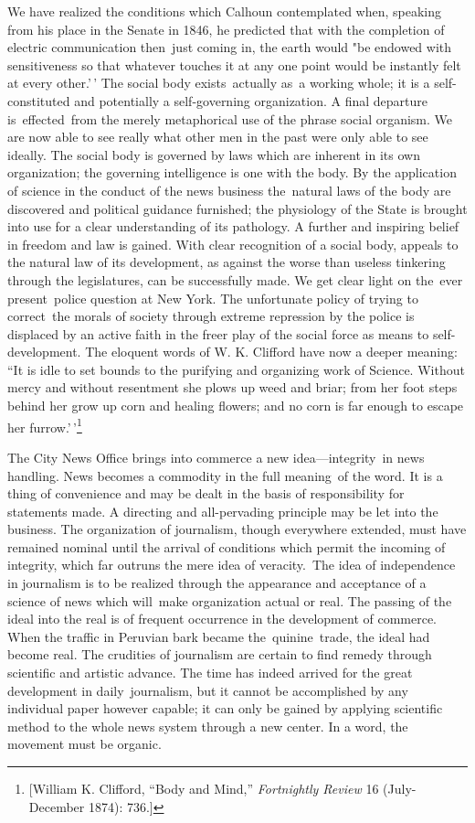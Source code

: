 \documentclass[openany,nobib]{tufte-book}
\begin{document}
We have realized the conditions which Calhoun contemplated when,
speaking from his place in the Senate in 1846, he predicted that with
the completion of electric communication then~just coming in, the earth
would "be endowed with sensitiveness so that whatever touches it at any
one point would be instantly felt at every other.'\,' The social body
exists~actually as~a working whole; it is a self-constituted and
potentially a self-governing organization. A final departure
is~effected~from the merely metaphorical use of the phrase social
organism. We are now able to see really what other men in the past were
only able to see ideally. The social body is governed by laws which are
inherent in its own organization; the governing intelligence is one with
the body. By the application of science in the conduct of the news
business the~natural laws of the body are discovered and political
guidance furnished; the physiology of the State is brought into use for
a clear understanding of its pathology. A further and inspiring belief
in freedom and law is gained. With clear recognition of a social body,
appeals to the natural law of its development, as against the worse than
useless tinkering through the legislatures, can be successfully made. We
get clear light on the~ever present~police question at New York. The
unfortunate policy of trying to correct~the morals of society through
extreme repression by the police is displaced by an active faith in the
freer play of the social force as means to self-development. The
eloquent words of W. K. Clifford have now a deeper meaning: ``It is idle
to set bounds to the purifying and organizing work of Science. Without
mercy and without resentment she plows up weed and briar; from her foot
steps behind her grow up corn and healing flowers; and no corn is far
enough to escape her furrow.'\,'\footnote{{[}William K. Clifford, ``Body
  and Mind,'' \emph{Fortnightly Review} 16 (July-December 1874): 736.{]}}~

The City News Office brings into commerce a new idea---integrity~in news
handling. News becomes a commodity in the full meaning~of the word. It
is a thing of convenience and may be dealt in the basis of
responsibility for statements made. A directing and all-pervading
principle may be let into the business. The organization of journalism,
though everywhere extended, must have remained nominal until the arrival
of conditions which permit the incoming of integrity, which far outruns
the mere idea of veracity.~The idea of independence in journalism is to
be realized through the appearance and acceptance of a science of news
which will~make organization actual or real. The passing of the ideal
into the real is of frequent occurrence in the development of commerce.
When the traffic in Peruvian bark became the~quinine~trade, the ideal
had become real. The crudities of journalism are certain to find remedy
through scientific and artistic advance. The time has indeed arrived for
the great development in daily~journalism, but it cannot be accomplished
by any individual paper however capable; it can only be gained by
applying scientific method to the whole news system through a new
center. In a word, the movement must be organic. ~
\end{document}
